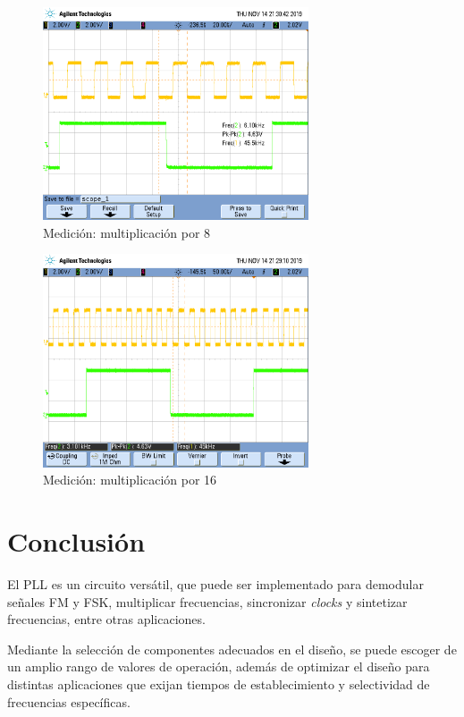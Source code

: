 \begin{figure}[H]
    \centering
    \includegraphics[width=0.7\textwidth]{../Ex2/resources/medicionstep8.png}
    \caption{Medición: multiplicación por 8}
    \label{medicionstep8}
\end{figure}

\begin{figure}[H]
    \centering
    \includegraphics[width=0.7\textwidth]{../Ex2/resources/medicionstep16.png}
    \caption{Medición: multiplicación por 16}
    \label{medicionstep16}
\end{figure}


\section{Conclusión}
El PLL es un circuito versátil, que puede ser implementado para demodular señales FM y FSK, multiplicar frecuencias, sincronizar \emph{clocks} y sintetizar frecuencias, entre otras aplicaciones.

Mediante la selección de componentes adecuados en el diseño, se puede escoger de un amplio rango de valores de operación, además de optimizar el diseño para distintas aplicaciones que exijan tiempos de establecimiento y selectividad de frecuencias específicas.

